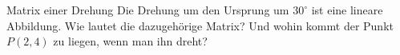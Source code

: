 \begin{bsp}
    {Matrix einer Drehung}{}
    Die Drehung um den Ursprung um \( 30^\circ \) ist eine lineare Abbildung. Wie lautet die dazugehörige Matrix? Und wohin kommt der Punkt \( P(2, 4) \) zu liegen, wenn man ihn dreht?
    
    \vspace*{12 cm}










\end{bsp}
